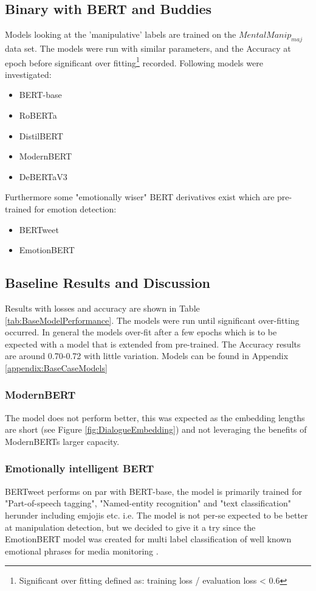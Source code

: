 \documentclass[
	letterpaper, %
	12pt, %
	unnumberedsections, %
	twoside, %
]{LTJournalArticle}
\begin{document}
\subsection{Binary with BERT and Buddies}
Models looking at the 'manipulative' labels are trained on the $MentalManip_{maj}$ data set. The models were run with similar parameters, and the Accuracy at epoch before significant over fitting\footnote{Significant over fitting defined as: training loss / evaluation loss < 0.6} recorded. Following models were investigated:
\begin{itemize}
	\item BERT-base \cite{BERT-base}
	\item RoBERTa \cite{RoBERTa}
	\item DistilBERT \cite{DistilBERT}
	\item ModernBERT \cite{ModernBERT}
	\item DeBERTaV3 \cite{DeBERTaV3}
\end{itemize}
Furthermore some "emotionally wiser" BERT derivatives exist which are pre-trained for emotion detection:
\begin{itemize}
	\item BERTweet \cite{BERTweet}
	\item EmotionBERT \cite{EmotionBERT}
\end{itemize}

\subsection{Baseline Results and Discussion}\label{sec:BaselineResults}
Results with losses and accuracy are shown in Table \ref{tab:BaseModelPerformance}. The models were run until significant over-fitting occurred. In general the models over-fit after a few epochs which is to be expected with a model that is extended from pre-trained. The Accuracy results are around 0.70-0.72 with little variation. Models can be found in Appendix \ref{appendix:BaseCaseModels}

\subsubsection{ModernBERT} The model does not perform better, this was expected as the embedding lengths are short (see Figure \ref{fig:DialogueEmbedding}) and not leveraging the benefits of ModernBERTs larger capacity.

\subsubsection{Emotionally intelligent BERT}
BERTweet performs on par with BERT-base, the model is primarily trained for "Part-of-speech tagging", "Named-entity recognition" and "text classification" \cite{BERTweet} herunder including emjojis etc. i.e. The model is not per-se expected to be better at manipulation detection, but we decided to give it a try since the EmotionBERT model was created for multi label classification of well known emotional phrases for media monitoring \cite{EmotionBERT}.
\end{document}
